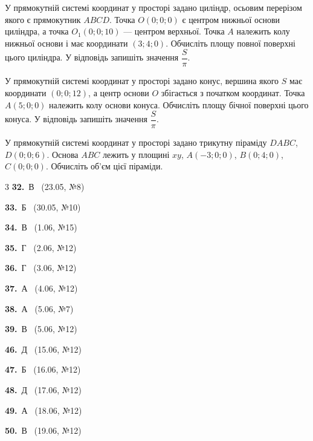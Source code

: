 \documentclass[12pt]{article}
\begin{document}
\begin{samepage}
\noindent\zadnum У прямокутній системі координат у просторі задано циліндр, осьовим перерізом якого є прямокутник $ABCD$. Точка $O(0; 0; 0)$ є центром нижньої основи циліндра, а точка $O_1(0; 0; 10)$ --- центром верхньої. Точка $A$ належить колу нижньої основи і має координати $(3; 4; 0)$. Обчисліть площу повної поверхні цього циліндра. У відповідь запишіть значення $\dfrac{S}{\pi}$. 
\nmtAnswerBox
\par{}
\end{samepage}

\begin{samepage}
\noindent\zadnum У прямокутній системі координат у просторі задано конус, вершина якого $S$ має координати $(0; 0; 12)$, а центр основи $O$ збігається з початком координат. Точка $A(5; 0; 0)$ належить колу основи конуса. Обчисліть площу бічної поверхні цього конуса. У відповідь запишіть значення $\dfrac{S}{\pi}$. 
\nmtAnswerBox
\par{}
\end{samepage}

\begin{samepage}
\noindent\zadnum У прямокутній системі координат у просторі задано трикутну піраміду $DABC$, $D(0; 0; 6)$. Основа $ABC$ лежить у площині $xy$, $A(-3; 0; 0)$, $B(0; 4; 0)$, $C(0; 0; 0)$. Обчисліть об'єм цієї піраміди. 
\nmtAnswerBox
\par{}
\end{samepage}

\ifshowsolutions
{}
\begin{multicols}{3}\noindent
\noindent\textbf{32.}~В \ {\scriptsize\color{gray}(23.05, №8)}\par
\noindent\textbf{33.}~Б \ {\scriptsize\color{gray}(30.05, №10)}\par
\noindent\textbf{34.}~В \ {\scriptsize\color{gray}(1.06, №15)}\par
\noindent\textbf{35.}~Г \ {\scriptsize\color{gray}(2.06, №12)}\par
\noindent\textbf{36.}~Г \ {\scriptsize\color{gray}(3.06, №12)}\par
\noindent\textbf{37.}~А \ {\scriptsize\color{gray}(4.06, №12)}\par
\noindent\textbf{38.}~А \ {\scriptsize\color{gray}(5.06, №7)}\par
\noindent\textbf{39.}~В \ {\scriptsize\color{gray}(5.06, №12)}\par
\noindent\textbf{46.}~Д \ {\scriptsize\color{gray}(15.06, №12)}\par
\noindent\textbf{47.}~Б \ {\scriptsize\color{gray}(16.06, №12)}\par
\noindent\textbf{48.}~Д \ {\scriptsize\color{gray}(17.06, №12)}\par
\noindent\textbf{49.}~А \ {\scriptsize\color{gray}(18.06, №12)}\par
\noindent\textbf{50.}~В \ {\scriptsize\color{gray}(19.06, №12)}\par
\end{multicols}
\fi

\endgroup
\end{document}
